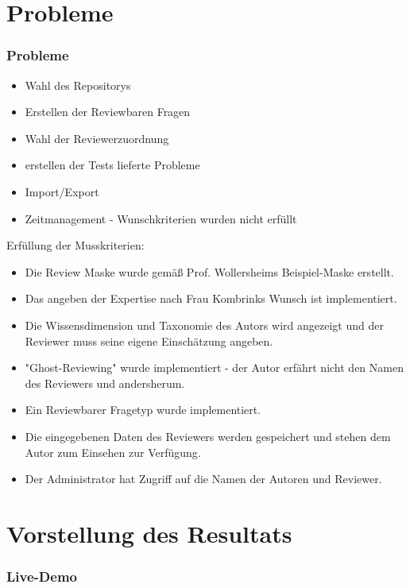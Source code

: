 \documentclass{beamer}
\begin{document}
	\section{Probleme}
		\begin{frame}
			\frametitle{Probleme}
    		\begin{itemize}
    			\item Wahl des Repositorys
		    	\item Erstellen der Reviewbaren Fragen
    			\item Wahl der Reviewerzuordnung
    			\item erstellen der Tests lieferte Probleme
    			\item Import/Export
    			\item Zeitmanagement - Wunschkriterien wurden nicht erfüllt
    		\end{itemize}
		\end{frame}
		\begin{frame}
			Erfüllung der Musskriterien:
			\begin{itemize}
				\item Die Review Maske wurde gemäß Prof. Wollersheims Beispiel-Maske erstellt.
				\item Das angeben der Expertise nach Frau Kombrinks Wunsch ist implementiert.
				\item Die Wissensdimension und Taxonomie des Autors wird angezeigt und der Reviewer muss seine eigene Einschätzung angeben.
				\item "Ghost-Reviewing" wurde implementiert - der Autor erfährt nicht den Namen des Reviewers und andersherum.
				\item Ein Reviewbarer Fragetyp wurde implementiert.	
				\item Die eingegebenen Daten des Reviewers werden gespeichert und stehen dem Autor zum Einsehen zur Verfügung.
				\item Der Administrator hat Zugriff auf die Namen der Autoren und Reviewer.
			\end{itemize}
		\end{frame}

	\section{Vorstellung des Resultats}
		\begin{frame}
		\frametitle{Live-Demo}
		\end{frame}
\end{document}
